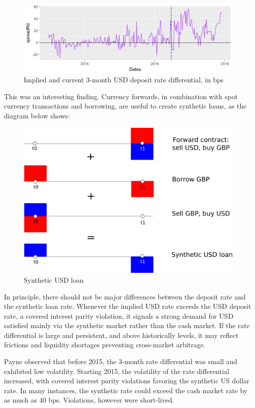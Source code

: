 \documentclass[]{book}
\theoremstyle{definition}
\theoremstyle{definition}
\theoremstyle{definition}
\theoremstyle{remark}
\begin{document}
\begin{figure}
\includegraphics[width=1\linewidth]{images/unnamed-chunk-9-1} \caption{Implied and current 3-month USD deposit rate differential, in bps}\label{fig:unnamed-chunk-9}
\end{figure}

This was an interesting finding. Currency forwards, in combination with
spot currency transactions and borrowing, are useful to create synthetic
loans, as the diagram below shows:

\hypertarget{synthetic-USD-loan}{}
\begin{figure}
\includegraphics[width=0.7\linewidth]{images/figSyntheticUSDLoan} \caption{Synthetic USD loan}\label{fig:unnamed-chunk-10}
\end{figure}

In principle, there should not be major differences between the deposit
rate and the synthetic loan rate. Whenever the implied USD rate exceeds
the USD deposit rate, a covered interest parity violation, it signals a
strong demand for USD satisfied mainly via the synthetic market rather
than the cash market. If the rate differential is large and persistent,
and above historically levels, it may reflect frictions and liquidity
shortages preventing cross-market arbitrage.

Payne observed that before 2015, the 3-month rate differential was small
and exhibited low volatility. Starting 2015, the volatility of the rate
differential increased, with covered interest parity violations favoring
the synthetic US dollar rate. In many instances, the synthetic rate
could exceed the cash market rate by as much as 40 bps. Violations,
however were short-lived.
\end{document}
